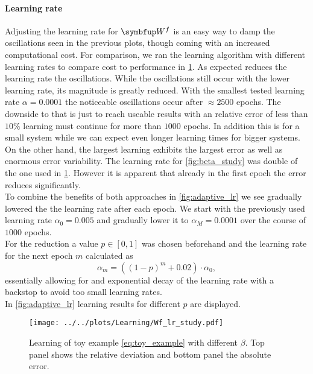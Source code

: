 \paragraph{Learning rate}
Adjusting the learning rate for $\bmu{W}^f$ is an easy way to damp the oscillations seen in the previous plots, though coming with an increased computational cost. For comparison, we ran the learning algorithm with different learning rates to compare cost to performance in \cref{fig:lr_fast_study}. As expected reduces the learning rate the oscillations. While the oscillations still occur with the lower learning rate, its magnitude is greatly reduced. With the smallest tested learning rate $\alpha = 0.0001$ the noticeable oscillations occur after $\approx 2500$ epochs. The downside to that is just to reach useable results with an relative error of less than $10\%$ learning must continue for more than $1000$ epochs. In addition this is for a small system while we can expect even longer learning times for bigger systems.\\
On the other hand, the largest learning exhibits the largest error as well as enormous error variability. The learning rate for \cref{fig:beta_study} was double of the one used in \cref{fig:lr_fast_study}. However it is apparent that already in the first epoch the error reduces significantly.\\
To combine the benefits of both approaches in \cref{fig:adaptive_lr} we see gradually lowered the the learning rate after each epoch. We start with the previously used learning rate $\alpha_0 = 0.005$ and gradually lower it to $\alpha_M = 0.0001$ over the course of $1000$ epochs.\\
For the reduction a value $p\in \left[0,1\right]$ was chosen beforehand and the learning rate for the next epoch $m$ calculated as
\begin{equation}
	\alpha_{m} = (\left(1-p\right)^m + 0.02)\cdot\alpha_0,
\end{equation}
essentially allowing for and exponential decay of the learning rate with a backstop to avoid too small learning rates.\\
In \cref{fig:adaptive_lr} learning results for different $p$ are displayed.


\begin{figure}
	\centering
	\texttt{[image: ../../plots/Learning/Wf\_lr\_study.pdf]}
	\caption{Learning of toy example \cref{eq:toy_example} with different $\beta$. Top panel shows the relative deviation and bottom panel the absolute error.}
	\label{fig:lr_fast_study}
\end{figure}
